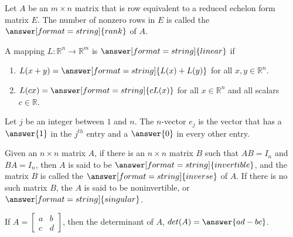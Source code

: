 \documentclass[nooutcomes]{ximera}
\begin{document}
\begin{question}
Let $A$ be an $m \times n$ matrix that is row equivalent to a reduced echelon form matrix $E$. 
The number of nonzero rows in $E$ is called the $\answer[format=string]{rank}$ of $A$.
\end{question} 

\begin{question}
A mapping $L: \mathbb{R}^n \to \mathbb{R}^m$ is $\answer[format=string]{linear}$ if 
\begin{enumerate}
\item $L(x+y)=\answer[format=string]{L(x)+L(y)}$ for all $x,y\in \mathbb{R}^n$. 
\item $L(cx)=\answer[format=string]{cL(x)}$ for all $x\in \mathbb{R}^n$ and all scalars $c\in \mathbb{R}$.
\end{enumerate}
\end{question} 

\begin{question}
Let $j$ be an integer between $1$ and $n$. The $n$-vector $e_j$ is the vector that has a $\answer{1}$ in the $j^{th}$ entry and a $\answer{0}$ in every other entry. 
\end{question} 

\begin{question}
Given an $n \times n$ matrix $A$, if there is an $n \times n$ matrix $B$ such that 
$AB=I_n$ and $BA=I_n$, then $A$ is said to be $\answer[format=string]{invertible}$, and the matrix $B$ is called the $\answer[format=string]{inverse}$ of $A$. If there is no such matrix $B$, the $A$ is said to be noninvertible, or $\answer[format=string]{singular}$. 
\end{question} 

\begin{question}
If $A = \begin{bmatrix} a & b \\ c & d\end{bmatrix}$, then the determinant of $A$, $det(A) = \answer{ad - bc}$. 
\end{question} 
\end{document}

